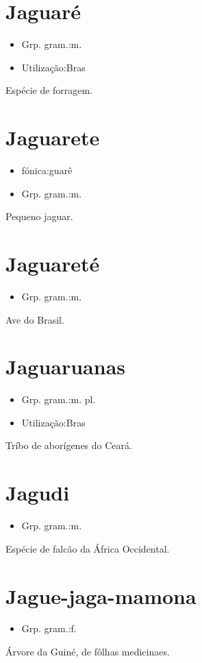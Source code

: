 \documentclass{article}
\begin{document}
\section{Jaguaré}
\begin{itemize}
\item {Grp. gram.:m.}
\end{itemize}
\begin{itemize}
\item {Utilização:Bras}
\end{itemize}
Espécie de forragem.
\section{Jaguarete}
\begin{itemize}
\item {fónica:guarê}
\end{itemize}
\begin{itemize}
\item {Grp. gram.:m.}
\end{itemize}
Pequeno jaguar.
\section{Jaguareté}
\begin{itemize}
\item {Grp. gram.:m.}
\end{itemize}
Ave do Brasil.
\section{Jaguaruanas}
\begin{itemize}
\item {Grp. gram.:m. pl.}
\end{itemize}
\begin{itemize}
\item {Utilização:Bras}
\end{itemize}
Tríbo de aborígenes do Ceará.
\section{Jagudi}
\begin{itemize}
\item {Grp. gram.:m.}
\end{itemize}
Espécie de falcão da África Occidental.
\section{Jague-jaga-mamona}
\begin{itemize}
\item {Grp. gram.:f.}
\end{itemize}
Árvore da Guiné, de fôlhas medicinaes.
\end{document}
